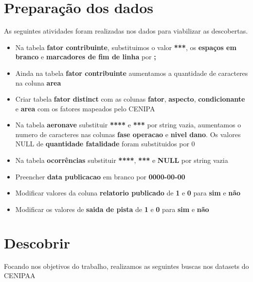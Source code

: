 \documentclass[conference]{IEEEtran}
\begin{document}
\section{Preparação dos dados}

As seguintes atividades foram realizadas nos dados para viabilizar as descobertas.

\begin{itemize}
 \item Na tabela \textbf{fator contribuinte}, substituimos o valor \textbf{***}, os \textbf{espaços em branco} e \textbf{marcadores de fim de linha} por \textbf{;}
 \item Ainda na tabela \textbf{fator contribuinte} aumentamos a quantidade de caracteres na coluna \textbf{area}
 \item Criar tabela \textbf{fator distinct} com as colunas \textbf{fator}, \textbf{aspecto}, \textbf{condicionante} e \textbf{area} com os fatores mapeados pelo CENIPA
 \item Na tabela \textbf{aeronave} substituir \textbf{****} e \textbf{***} por string vazia, aumentamos o numero de caracteres nas colunas \textbf{fase operacao} e \textbf{nivel dano}. Os valores NULL de \textbf{quantidade fatalidade} foram substituidos por 0 
 \item Na tabela \textbf{ocorrências} substituir \textbf{****}, \textbf{***} e \textbf{NULL} por string vazia
 \item Preencher \textbf{data publicacao} em branco por \textbf{0000-00-00}
 \item Modificar valores da coluna \textbf{relatorio publicado} de \textbf{1} e \textbf{0} para \textbf{sim} e \textbf{não}
 \item Modificar os valores de \textbf{saida de pista} de \textbf{1} e \textbf{0} para \textbf{sim} e \textbf{não}
\end{itemize}

\section{Descobrir}

Focando nos objetivos do trabalho, realizamos as seguintes buscas nos datasets do CENIPAA\\
\end{document}
